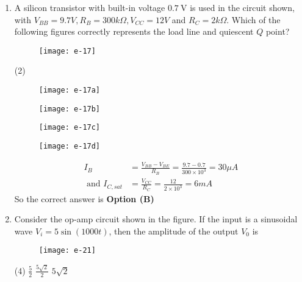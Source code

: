 \begin{enumerate}
	\item A silicon transistor with built-in voltage $0.7 \mathrm{~V}$ is used in the circuit shown, with $V_{B B}=9.7 V, R_{B}=300 k \Omega, V_{C C}=12 V$ and $R_{C}=2 k \Omega$. Which of the following figures correctly represents the load line and quiescent $Q$ point?
{	}
\begin{figure}[H]
\centering
\texttt{[image: e-17]}
\end{figure}
\begin{tasks}(2)
\task[\textbf{A.}] \begin{figure}[H]
	\centering
	\texttt{[image: e-17a]}
\end{figure}
\task[\textbf{B.}] \begin{figure}[H]
	\centering
	\texttt{[image: e-17b]}
\end{figure}
\task[\textbf{C.}] \begin{figure}[H]
	\centering
	\texttt{[image: e-17c]}
\end{figure}
\task[\textbf{D.}] \begin{figure}[H]
	\centering
	\texttt{[image: e-17d]}
\end{figure}
\end{tasks}
\begin{answer}
\begin{align*}
I_{B}&=\frac{V_{B B}-V_{B E}}{R_{B}}=\frac{9.7-0.7}{300 \times 10^{3}}=30 \mu A\\\text{ and } I_{C, s a t}&=\frac{V_{C C}}{R_{C}}=\frac{12}{2 \times 10^{3}}=6 m A
\end{align*}
So the correct answer is \textbf{Option (B)}
\end{answer}
	\item Consider the op-amp circuit shown in the figure.
	If the input is a sinusoidal wave $V_{i}=5 \sin (1000 t)$, then the amplitude of the output $V_{0}$ is
{	}
\begin{figure}[H]
\centering
\texttt{[image: e-21]}
\end{figure}
\begin{tasks}(4)
\task[\textbf{A.}] $\frac{5}{2}$
\task[\textbf{C.}] $\frac{5 \sqrt{2}}{2}$
\task[\textbf{D.}] $5 \sqrt{2}$
\end{tasks}
\begin{answer}
\begin{align*}

\end{align*}
\end{answer}
\end{enumerate}

